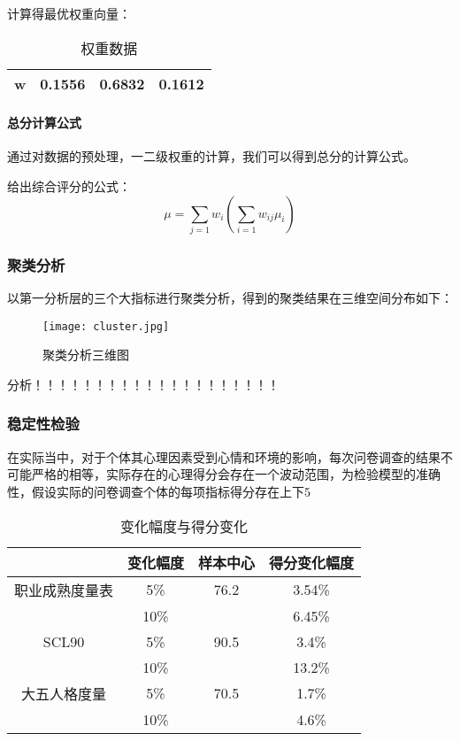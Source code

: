 \documentclass[withoutpreface,bwprint]{cumcmthesis} %
\begin{document}
计算得最优权重向量：

\begin{table}[h]
    \centering
    \begin{tabular}{cccc}
        \toprule
        w & 0.1556 & 0.6832 & 0.1612 \\ \bottomrule
    \end{tabular}
    \caption{权重数据}
    \label{tab:weights}
\end{table}

\paragraph*{总分计算公式} 通过对数据的预处理，一二级权重的计算，我们可以得到总分的计算公式。


给出综合评分的公式：
\begin{equation}
    \mu = \sum_{j=1} w_i (\sum_{i=1} w_{ij}\mu_i)
\end{equation}


\subsubsection{聚类分析}

以第一分析层的三个大指标进行聚类分析，得到的聚类结果在三维空间分布如下：


\begin{figure}[!h]
    \centering
    \texttt{[image: cluster.jpg]}
    \caption{聚类分析三维图}
    \label{fig:cluster}
\end{figure}

分析！！！！！！！！！！！！！！！！！！！！


\subsubsection{稳定性检验}

在实际当中，对于个体其心理因素受到心情和环境的影响，每次问卷调查的结果不可能严格的相等，实际存在的心理得分会存在一个波动范围，为检验模型的准确性，假设实际的问卷调查个体的每项指标得分存在上下5%

\begin{table}[h]
    \centering
    \begin{tabular}{cccc}
        \toprule
        & 变化幅度 & 样本中心 & 得分变化幅度 \\ \midrule
        职业成熟度量表 & 5\% & 76.2 & 3.54\% \\ 
        & 10\% & & 6.45\% \\ \midrule
        SCL90 & 5\% & 90.5 & 3.4\% \\ 
        & 10\% & & 13.2\% \\ \midrule
        大五人格度量 & 5\% & 70.5 & 1.7\% \\ 
        & 10\% & & 4.6\% \\ \bottomrule
    \end{tabular}
    \caption{变化幅度与得分变化}
    \label{tab:score_changes}
\end{table}
\end{document}
